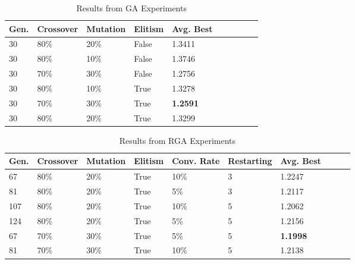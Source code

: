 \documentclass[10pt]{beamer}
\begin{document}
\begin{frame}

	\begin{table}
	  \caption{Results from GA Experiments}
	  \begin{tabular}{ | l | l | l | l | l | l | l | l | l | l | }
	    \hline
	    Gen. & Crossover & Mutation & Elitism &  Avg. Best \\ \hline \hline
	    30 & 80\% & 20\% & False & 1.3411 \\ \hline
	    30 & 80\% & 10\% & False & 1.3746 \\ \hline
	    30 & 70\% & 30\% & False & 1.2756 \\ \hline
	    30 & 80\% & 10\% & True & 1.3278 \\ \hline
	    30 & 70\% & 30\% & True & \textbf{1.2591} \\ \hline
	    30 & 80\% & 20\% & True & 1.3299 \\ \hline
	  \end{tabular}
	\end{table}

	\begin{table}
	  \caption{Results from RGA Experiments}
	  \begin{tabular}{ | l | l | l | l | l | l | l | l | l | l | }
	    \hline
	    Gen. & Crossover & Mutation & Elitism & Conv. Rate & Restarting &  Avg. Best \\ \hline \hline
	    67 & 80\% & 20\% & True & 10\% & 3 & 1.2247 \\ \hline
	    81 & 80\% & 20\% & True & 5\% & 3 & 1.2117 \\ \hline
	    107 & 80\% & 20\% & True & 10\% & 5 & 1.2062 \\ \hline
	    124 & 80\% & 20\% & True & 5\% & 5 & 1.2156 \\ \hline
	    67 & 70\% & 30\% & True & 5\% & 5 & \textbf{1.1998} \\ \hline
	    81 & 70\% & 30\% & True & 10\% & 5 & 1.2138 \\ \hline
	  \end{tabular}
	\end{table}

\end{frame}
\end{document}
